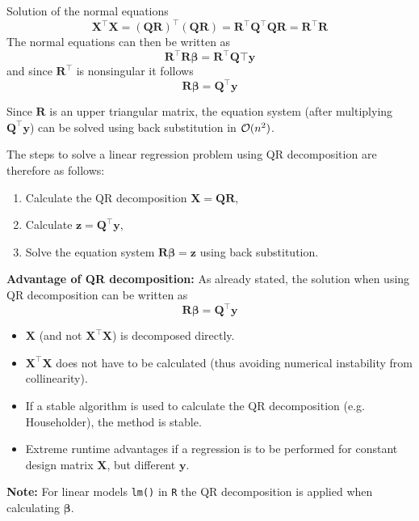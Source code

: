 \documentclass[11pt,compress,t,notes=noshow, xcolor=table]{beamer}
\begin{document}
\begin{vbframe}{Solution of the normal equations}
$$
\mathbf{X}^\top\mathbf{X} = (\mathbf{QR})^\top(\mathbf{QR}) = \mathbf{R}^\top\mathbf{Q}^\top\mathbf{QR} =
\mathbf{R}^\top\mathbf{R}
$$
The normal equations can then be written as
$$
\mathbf{R}^\top\mathbf{R}\boldsymbol{\beta} = \mathbf{R}^\top\mathbf{Q}\top\mathbf{y}
$$
and since $\mathbf{R}^\top$ is nonsingular it follows
$$
\mathbf{R}\boldsymbol{\beta} = \mathbf{Q}^\top\mathbf{y} %
$$

Since $\textbf{R}$ is an upper triangular matrix, the equation system (after multiplying $\bm{Q}^\top \bm{y}$) can be solved using back substitution in $\mathcal{O}(n^2)$.

\framebreak

The steps to solve a linear regression problem using QR decomposition are therefore as follows:

\begin{enumerate}
\item Calculate the QR decomposition $\mathbf{X} = \mathbf{Q}\mathbf{R}$,
\item Calculate $\bm{z} = \bm{Q}^\top \bm{y}$,
\item Solve the equation system $\bm{R}\boldsymbol{\beta} = \bm{z}$ using back substitution.
\end{enumerate}

\framebreak

\textbf{Advantage of QR decomposition:} As already stated, the solution when using QR decomposition can be written as
$$
\mathbf{R}\boldsymbol{\beta} = \mathbf{Q}^\top\mathbf{y}
$$

\begin{itemize}
\item $\mathbf{X}$ (and not $\bm{X}^\top\bm{X}$) is decomposed directly.
\item $\mathbf{X}^\top\mathbf{X}$ does not have to be calculated (thus avoiding numerical instability from collinearity).\\
\item If a stable algorithm is used to calculate the QR decomposition (e.g. Householder), the method is stable.
\item Extreme runtime advantages if a regression is to be performed for constant design matrix $\bm{X}$, but different $\bm{y}$.
\end{itemize}

\textbf{Note:} For linear models \texttt{lm()} in \texttt{R} the QR decomposition is applied when calculating $\boldsymbol{\beta}$.

\end{vbframe}
\end{document}
